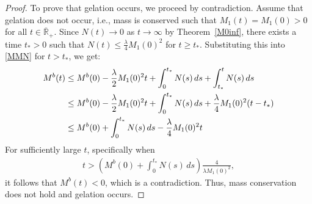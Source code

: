\documentclass[10pt,a4paper]{amsart}
\def\Rb{\overline{{\mathbb R}}_+}
\begin{document}
\begin{proof}
To prove that gelation occurs, we proceed by contradiction. 
Assume that gelation does not occur, i.e., mass is conserved such that $M_1(t)=M_1(0)>0$ for all $t\in\Rb$.
Since $N(t)\to 0$ as $t\to\infty$ by Theorem~\ref{M0inf}, there exists a time $t_*>0$ such that
$N(t)\le \frac{\lambda}{4}M_1(0)^2$ for $t\ge t_*$.
Substituting this into \eqref{MMN} for $t>t_*$, we get:
\begin{align}
M^b(t)&\le M^b(0)-\frac{\lambda}{2}M_1(0)^2t
+\int_0^{t_*}N(s)\,ds+\int_{t_*}^tN(s)\,ds\label{fl}\\
&\le
M^b(0)-\frac{\lambda}{2}M_1(0)^2t
+\int_0^{t_*}N(s)\,ds
+\frac{\lambda}{4}M_1(0)^2(t-t_*)\notag\\
&\le
M^b(0)
+\int_0^{t_*}N(s)\,ds
-\frac{\lambda}{4}M_1(0)^2t\notag
\end{align}
For sufficiently large $t$, specifically when
\begin{align*}
t> \left(M^b(0)
+\int_0^{t_*}N(s)\,ds\right)\frac{4}{\lambda M_1(0)^2}, 
\end{align*}
it follows that $M^b(t)<0$,
which is a contradiction. Thus, mass conservation
does not hold and gelation occurs.
\end{proof}
\end{document}
